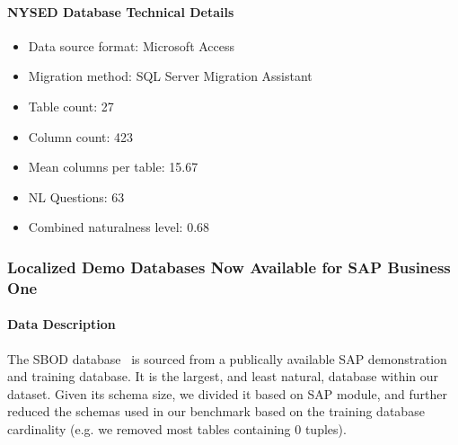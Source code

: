 
\paragraph{NYSED Database Technical Details}
\begin{itemize}
  \item Data source format: Microsoft Access
  \item Migration method: SQL Server Migration Assistant
  \item Table count: 27
  \item Column count: 423
  \item Mean columns per table: 15.67
  \item NL Questions: 63
  \item Combined naturalness level: 0.68 
\end{itemize}

\subsubsection{Localized Demo Databases Now Available for SAP Business One}

\paragraph{Data Description}
The SBOD database~\cite{sap-demo} is sourced from a publically available SAP demonstration and training database.
It is the largest, and least natural, database within our dataset.
Given its schema size, we divided it based on SAP module, and further reduced the schemas used in our benchmark based on the training database cardinality (e.g. we removed most tables containing 0 tuples).



